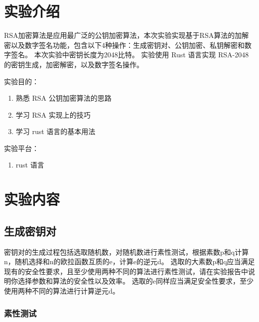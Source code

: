 \documentclass[degree=project,degree-type=project,cjk-font=windows]{thuthesis}
\begin{document}
\maketitle

\frontmatter
% 



\mainmatter

\chapter{实验介绍}
RSA加密算法是应用最广泛的公钥加密算法，本次实验实现基于RSA算法的加解密以及数字签名功能，包含以下4种操作：生成密钥对、公钥加密、私钥解密和数字签名。
本次实验中密钥长度为2048比特。
实验使用 Rust 语言实现 RSA-2048 的密钥生成，加密解密，以及数字签名操作。

实验目的：

\begin{enumerate}
    \item 熟悉 RSA 公钥加密算法的思路
    \item 学习 RSA 实现上的技巧
    \item 学习 rust 语言的基本用法
\end{enumerate}

实验平台：

\begin{enumerate}
    \item rust 语言
\end{enumerate}

\chapter{实验内容}

\section{生成密钥对}

密钥对的生成过程包括选取随机数，对随机数进行素性测试，根据素数p和q计算n，随机选择和n的欧拉函数互质的e，计算e的逆元d。
选取的大素数p和q应当满足现有的安全性要求，且至少使用两种不同的算法进行素性测试，请在实验报告中说明你选择参数和算法的安全性以及效率。
选取的e同样应当满足安全性要求，至少使用两种不同的算法进行计算逆元d。

\subsection{素性测试}
\end{document}
